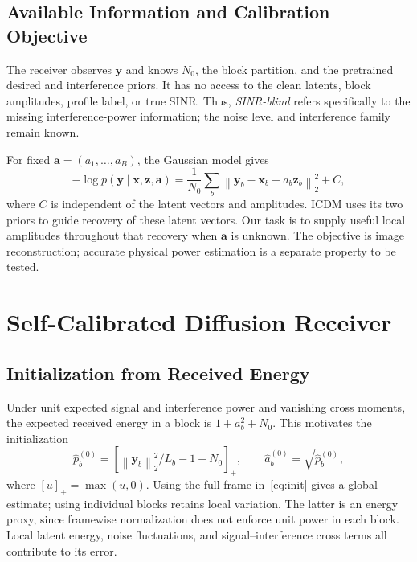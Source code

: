 \documentclass[conference]{IEEEtran}
\newcommand{\vect}[1]{\boldsymbol{#1}}
\newcommand{\norm}[1]{\left\lVert#1\right\rVert}
\newcommand{\pos}[1]{\left[#1\right]_{+}}
\begin{document}
\subsection{Available Information and Calibration Objective}

The receiver observes $\vect{y}$ and knows $N_0$, the block partition,
and the pretrained desired and interference priors. It has no access to
the clean latents, block amplitudes, profile label, or true SINR.
Thus, \emph{SINR-blind} refers specifically to the missing interference-power
information; the noise level and interference family remain known.

For fixed $\vect{a}=(a_1,\ldots,a_B)$, the Gaussian model gives
\begin{equation}
 -\log p(\vect{y}\mid\vect{x},\vect{z},\vect{a})
 =\frac{1}{N_0}\sum_b
 \norm{\vect{y}_b-\vect{x}_b-a_b\vect{z}_b}_2^2+C,
 \label{eq:likelihood}
\end{equation}
where $C$ is independent of the latent vectors and amplitudes.
ICDM uses its two priors to guide recovery of these latent vectors.
Our task is to supply useful local amplitudes throughout that recovery
when $\vect{a}$ is unknown. The objective is image reconstruction; accurate
physical power estimation is a separate property to be tested.

\section{Self-Calibrated Diffusion Receiver}

\subsection{Initialization from Received Energy}

Under unit expected signal and interference power and vanishing cross
moments, the expected received energy in a block is $1+a_b^2+N_0$.
This motivates the initialization
\begin{equation}
    \widehat p_b^{(0)}
    =\pos{\norm{\vect{y}_b}_2^2/L_b-1-N_0},\qquad
    \widehat a_b^{(0)}=\sqrt{\widehat p_b^{(0)}},
    \label{eq:init}
\end{equation}
where $[u]_+=\max(u,0)$. Using the full frame in~\eqref{eq:init}
gives a global estimate; using individual blocks retains local variation.
The latter is an energy proxy, since framewise normalization does not
enforce unit power in each block. Local latent energy, noise fluctuations,
and signal--interference cross terms all contribute to its error.
\end{document}
